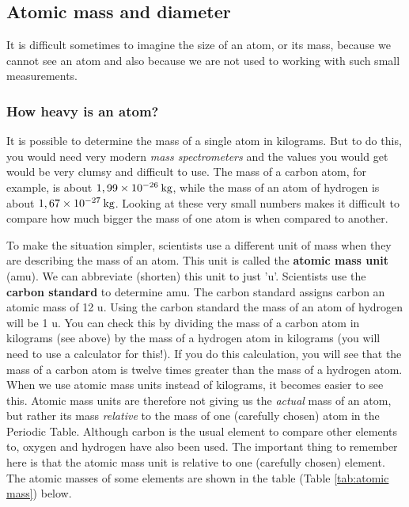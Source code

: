             \subsection{ Atomic mass and diameter}
            \nopagebreak
            \label{m38756*id254850}It is difficult sometimes to imagine the size of an atom, or its mass, because we cannot see an atom and also because we are not used to working with such small measurements.\par 
      \label{m38756*uid7}
            \subsubsection{ How heavy is an atom?}
            \nopagebreak
        \label{m38756*id254863}It is possible to determine the mass of a single atom in kilograms. But to do this, you would need very modern \textsl{mass spectrometers} and the values you would get would be very clumsy and difficult to use. The mass of a carbon atom, for example, is about $1,99\ensuremath{\times}{10}^{-26}\phantom{\rule{2pt}{0ex}}\mathrm{kg}$, while the mass of an atom of hydrogen is about $1,67\ensuremath{\times}{10}^{-27}\phantom{\rule{2pt}{0ex}}\mathrm{kg}$. Looking at these very small numbers makes it difficult to compare how much bigger the mass of one atom is when compared to another.\par 
        \label{m38756*id254908}To make the situation simpler, scientists use a different unit of mass when they are describing the mass of an atom. This unit is called the \textbf{atomic mass unit} (amu). We can abbreviate (shorten) this unit to just 'u'. Scientists use the \textbf{carbon standard} to determine amu. The carbon standard assigns carbon an atomic mass of 12 u. Using the carbon standard the mass of an atom of hydrogen will be 1 u. You can check this by dividing the mass of a carbon atom in kilograms (see above) by the mass of a hydrogen atom in kilograms (you will need to use a calculator for this!). If you do this calculation, you will see that the mass of a carbon atom is twelve times greater than the mass of a hydrogen atom. When we use atomic mass units instead of kilograms, it becomes easier to see this. Atomic mass units are therefore not giving us the \textsl{actual} mass of an atom, but rather its mass \textsl{relative} to the mass of one (carefully chosen) atom in the Periodic Table. Although carbon is the usual element to compare other elements to, oxygen and hydrogen have also been used. The important thing to remember here is that the atomic mass unit is relative to one (carefully chosen) element. The atomic masses of some elements are shown in the  table  (Table \ref{tab:atomic mass}) below.

